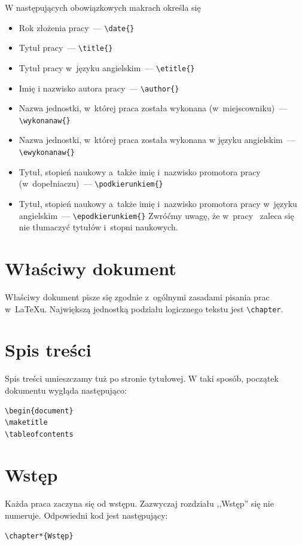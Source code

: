 \documentclass[wmii, inf, mgr]{uwmthesis}
\begin{document}
\smallbreak
W następujących obowiązkowych makrach określa się
\begin{itemize}
 \item Rok złożenia pracy~--- \verb|\date{}|
 \item Tytuł pracy~--- \verb|\title{}|
 \item Tytuł pracy w~języku angielskim~--- \verb|\etitle{}|
 \item Imię i nazwisko autora pracy~--- \verb|\author{}|
 \item Nazwa jednostki, w~której praca została wykonana (w~miejscowniku)~--- \verb|\wykonanaw{}|
 \item Nazwa jednostki, w~której praca została wykonana w języku angielskim~--- \verb|\ewykonanaw{}|
 \item Tytuł, stopień naukowy a~także imię i~nazwisko promotora pracy (w~dopełniaczu)~--- \verb|\podkierunkiem{}|
 \item Tytuł, stopień naukowy a~także imię i~nazwisko promotora pracy w~języku angielskim~--- \verb|\epodkierunkiem{}| Zwróćmy uwagę, że w~pracy~\cite{Maslowski} zaleca się nie tłumaczyć tytułów i~stopni naukowych.
\end{itemize}



\section{Właściwy dokument}
Właściwy dokument pisze się zgodnie z~ogólnymi zasadami pisania prac w~\LaTeX u. Największą jednostką podziału logicznego tekstu jest \verb|\chapter|.

\section{Spis treści}
Spis treści umieszczamy tuż po stronie tytułowej. W taki sposób, początek dokumentu wygląda następująco:
\begin{verbatim}
\begin{document}
\maketitle
\tableofcontents
\end{verbatim}


\section{Wstęp}
Każda praca zaczyna się od wstępu. Zazwyczaj rozdziału ,,Wstęp'' się nie numeruje. Odpowiedni kod jest następujący:
\begin{verbatim}
\chapter*{Wstęp}
\end{verbatim}
\end{document}
